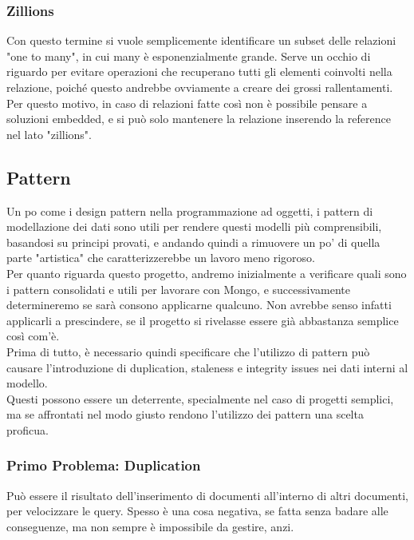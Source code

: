 \subsubsection{Zillions}
Con questo termine si vuole semplicemente identificare un subset delle relazioni "one to many", in cui many è esponenzialmente grande. Serve un occhio di riguardo per evitare operazioni che recuperano tutti gli elementi coinvolti nella relazione, poiché questo andrebbe ovviamente a creare dei grossi rallentamenti.
Per questo motivo, in caso di relazioni fatte così non è possibile pensare a soluzioni embedded, e si può solo mantenere la relazione inserendo la reference nel lato "zillions".

\subsection{Pattern}
Un po come i design pattern nella programmazione ad oggetti, i pattern di modellazione dei dati sono utili per rendere questi modelli più comprensibili, basandosi su principi provati, e andando quindi a rimuovere un po' di quella parte "artistica" che caratterizzerebbe un lavoro meno rigoroso.\\
Per quanto riguarda questo progetto, andremo inizialmente a verificare quali sono i pattern consolidati e utili per lavorare con Mongo, e successivamente determineremo se sarà consono applicarne qualcuno. Non avrebbe senso infatti applicarli a prescindere, se il progetto si rivelasse essere già abbastanza semplice così com'è.\\

\noindent Prima di tutto, è necessario quindi specificare che l'utilizzo di pattern può causare l'introduzione di duplication, staleness e integrity issues nei dati interni al modello.\\
Questi possono essere un deterrente, specialmente nel caso di progetti semplici, ma se affrontati nel modo giusto rendono l'utilizzo dei pattern una scelta proficua.\\

\subsubsection{Primo Problema: Duplication}
Può essere il risultato dell'inserimento di documenti all'interno di altri documenti, per velocizzare le query. Spesso è una cosa negativa, se fatta senza badare alle conseguenze, ma non sempre è impossibile da gestire, anzi.\\

